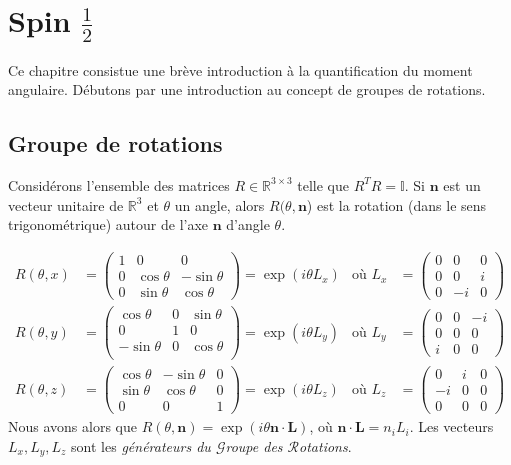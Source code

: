 \documentclass[../notesdecours.tex]{subfiles}
\begin{document}

\section{Spin $\frac{1}{2}$}
Ce chapitre consistue une brève introduction à la quantification du moment angulaire. Débutons par une introduction au concept de groupes de rotations.

\subsection{Groupe de rotations}

Considérons l'ensemble des matrices $R \in \mathbb{R}^{3\times 3}$ telle que $R^TR = \mathbb{I}$. Si $\bm{n}$ est un vecteur unitaire de $\mathbb{R}^3$ et $\theta$ un angle, alors $R(\theta,\bm{n}$) est la rotation (dans le sens trigonométrique) autour de l'axe $\bm{n}$ d'angle $\theta$.

\begin{align*}
    R(\theta,x) &= \begin{pmatrix}
    1 & 0 & 0\\
    0 & \cos\theta & -\sin\theta\\
    0 & \sin\theta & \cos\theta
    \end{pmatrix} = \exp (i\theta L_x)			&\text{où } L_x &= \begin{pmatrix}
    0 & 0 & 0\\
    0 & 0 & i\\
    0 & -i & 0
    \end{pmatrix}\\
    R(\theta,y) &= \begin{pmatrix}
    \cos\theta & 0 & \sin\theta\\
    0 & 1 & 0\\
    -\sin\theta & 0 & \cos\theta\\
    \end{pmatrix} = \exp(i\theta L_y)		&\text{où } L_y &= \begin{pmatrix}
    0 & 0 & -i\\
    0 & 0 & 0\\
    i & 0 & 0
    \end{pmatrix}\\
    R(\theta,z) &= \begin{pmatrix}
    \cos\theta & -\sin\theta & 0\\
    \sin\theta & \cos\theta & 0\\
    0 & 0 & 1
    \end{pmatrix} = \exp(i\theta L_z)		&\text{où } L_z &= \begin{pmatrix}
    0 & i & 0\\
    -i & 0 & 0\\
    0 & 0 & 0
    \end{pmatrix}
\end{align*}
Nous avons alors que $R(\theta,\bm{n}) = \exp (i\theta\bm{n}\cdot\bm{L})$, où $\bm{n}\cdot\bm{L} = n_iL_i$. Les vecteurs $L_x,L_y,L_z$ sont les \emph{générateurs du $\mathcal{G}$roupe des $\mathcal{R}$otations}.
\end{document}
